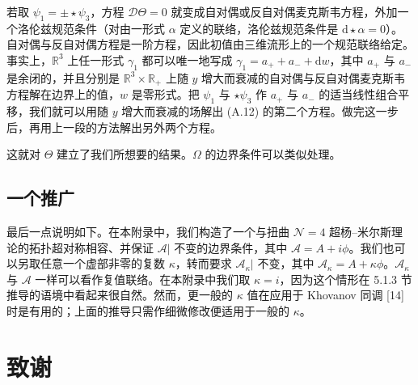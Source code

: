 \documentclass[11pt,a4paper,UTF8]{ctexart}
\theoremstyle{plain}
\theoremstyle{definition}
\begin{document}

若取 $\psi_1=\pm\star\psi_3$，方程 $\mathcal{D}\Theta=0$ 就变成自对偶或反自对偶麦克斯韦方程，外加一个洛伦兹规范条件（对由一形式 $\alpha$ 定义的联络，洛伦兹规范条件是 $\mathrm{d}\star\alpha=0$）。自对偶与反自对偶方程是一阶方程，因此初值由三维流形上的一个规范联络给定。事实上，$\mathbb{R}^3$ 上任一形式 $\gamma_1$ 都可以唯一地写成 $\gamma_1=a_++a_-+\mathrm{d}w$，其中 $a_+$ 与 $a_-$ 是余闭的，并且分别是 $\mathbb{R}^3\times\mathbb{R}_+$ 上随 $y$ 增大而衰减的自对偶与反自对偶麦克斯韦方程解在边界上的值，$w$ 是零形式。把 $\psi_1$ 与 $\star\psi_3$ 作 $a_+$ 与 $a_-$ 的适当线性组合平移，我们就可以用随 $y$ 增大而衰减的场解出 (A.12) 的第二个方程。做完这一步后，再用上一段的方法解出另外两个方程。

这就对 $\Theta$ 建立了我们所想要的结果。$\Omega$ 的边界条件可以类似处理。


\subsection{一个推广}

最后一点说明如下。在本附录中，我们构造了一个与扭曲 $\mathcal{N}=4$ 超杨–米尔斯理论的拓扑超对称相容、并保证 $\mathcal{A}|$ 不变的边界条件，其中 $\mathcal{A}=A+i\phi$。我们也可以另取任意一个虚部非零的复数 $\kappa$，转而要求 $\mathcal{A}_{\kappa}|$ 不变，其中 $\mathcal{A}_{\kappa}=A+\kappa\phi$。$\mathcal{A}_{\kappa}$ 与 $\mathcal{A}$ 一样可以看作复值联络。在本附录中我们取 $\kappa=i$，因为这个情形在 5.1.3 节推导的语境中看起来很自然。然而，更一般的 $\kappa$ 值在应用于 Khovanov 同调 [14] 时是有用的；上面的推导只需作细微修改便适用于一般的 $\kappa$。

\section*{致谢}
\end{document}
